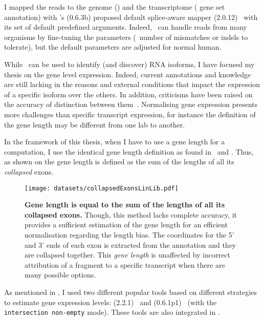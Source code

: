 I mapped the reads to the genome ()
and the transcriptome ( gene set annotation)
with \irap's (0.6.3b) proposed default splice-aware mapper
(2.0.12)~
with its set of default predefined arguments.
Indeed, \toph\ can handle reads from many organisms
by fine-tuning the parameters (\eg\ number of mismatches or indels to tolerate),
but the default parameters are adjusted for normal human.

While \Rnaseq\ can be used to identify (and discover) \gls{RNA}
isoforms, I have focused my thesis on the gene level expression. Indeed, current
annotations and knowledge are still lacking in the reasons and
external conditions that impact the expression of a specific isoform over the
others. In addition, criticisms have been raised on the accuracy of distinction
between them~. Normalising gene expression
presents more challenges than specific transcript expression,
for instance the definition of the gene length may be different
from one lab to another.

In the framework of this thesis,
when I have to use a gene length for a computation,
I use the identical gene length definition as found in
\irap\ and \egxa.
Thus, as shown on  the gene
length is defined as the sum of the lengths of all its \emph{collapsed} exons.

\begin{figure}
    \texttt{[image: datasets/collapsedExonsLinLib.pdf]}\centering
        \caption[Gene length is equal to the sum of the lengths of all its collapsed
        exons]{\label{fig:Genelength-collapsedExons}\textbf{Gene length is equal
        to the sum of the lengths of all its collapsed exons.} Though,
        this method lacks  complete accuracy, it provides a sufficient estimation
        of the gene length for an efficient normalisation regarding the length bias.
        The coordinates for the 5' and 3' ends of each exon is extracted from
        the annotation and they are collapsed together. This \emph{gene length}
        is unaffected by incorrect attribution of a fragment to a
        specific transcript when there are many possible options.}
    \end{figure}

As mentioned in , I used two different popular tools based on
different strategies to estimate
gene expression levels:
(2.2.1)~
and 
(0.6.1p1)~ (with the \texttt{intersection non-empty} mode).
These tools are also integrated in \irap.

